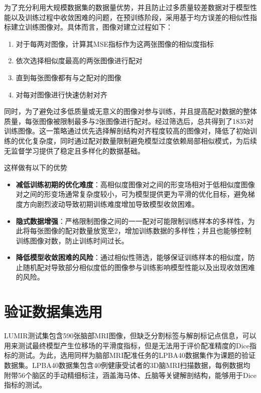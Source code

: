 为了充分利用大规模数据集的数据量优势，并且防止过多质量较差数据对于模型性能以及训练过程中收敛困难的问题，在预训练阶段，采用基于均方误差的相似性指标建立训练图像对。具体而言，图像对建立过程如下：

\begin{enumerate}
    \item 对于每两对图像，计算其MSE指标作为这两张图像的相似度指标
    \item 依次选择相似度最高的两张图像进行配对
    \item 直到每张图像都有与之配对的图像
    \item 对每对图像进行快速仿射对齐
\end{enumerate}

同时，为了避免过多低质量或无意义的图像对参与训练，并且提高配对数据的整体质量，每张图像被限制最多与2张图像进行配对。经过筛选后，总共得到了1835对训练图像。这一策略通过优先选择解剖结构对齐程度较高的图像对，降低了初始训练的优化复杂度，同时通过配对数量限制避免模型过度依赖局部相似模式，为后续无监督学习提供了稳定且多样化的数据基础。

这样做有以下的优势

\begin{itemize}
    \item \textbf{减低训练初期的优化难度}：高相似度图像对之间的形变场相对于低相似度图像对之间的形变场通常复杂度较小，可为模型提供更为平滑的优化目标，避免梯度方向剧烈波动导致初期训练难度增加导致模型收敛困难。
    \item \textbf{隐式数据增强}：严格限制图像之间的一一配对可能限制训练样本的多样性，为此将每张图像的配对数量放宽至2，增加训练数据的多样性；并且也能够控制训练图像对数，防止训练时间过长。
    \item \textbf{降低模型收敛困难的风险}：通过相似性筛选，能够保证训练样本的相似度，防止随机配对导致部分相似度低的图像参与训练影响模型性能以及出现收敛困难的风险。
\end{itemize}

\section{验证数据集选用}

LUMIR测试集包含590张脑部MRI图像，但缺乏分割标签与解剖标记点信息，可以用来测试最终模型产生位移场的平滑度指标，但是无法用于评价配准精度的Dice指标的测试。为此，选用同样为脑部MRI配准任务的LPBA40数据集作为课题的验证数据集。LPBA40数据集包含40例健康受试者的3D脑MRI扫描数据，每例数据均附带56个脑区的手动精细标注，涵盖海马体、丘脑等关键解剖结构，能够用于Dice指标的测试。

